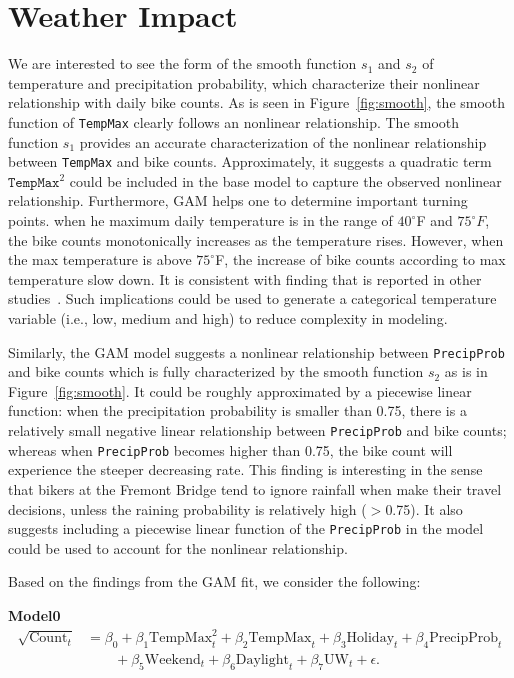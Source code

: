 \documentclass [11pt, proquest] {uwthesis}[2015/03/03]
\begin{document}
\section{Weather Impact}

We are interested to see the form of the smooth function $s_1$ and $s_2$ of temperature and precipitation probability, which characterize their nonlinear relationship with daily bike counts. As is seen in Figure~\ref{fig:smooth}, the smooth function of \texttt{TempMax} clearly follows an nonlinear relationship. The smooth function $s_1$ provides an accurate characterization of the nonlinear relationship between \texttt{TempMax} and bike counts. Approximately, it suggests a quadratic term $\texttt{TempMax}^2$ could be included in the base model to capture the observed nonlinear relationship. Furthermore, GAM helps one to determine important turning points. 
when he maximum daily temperature is in the range of $40^{\circ}$F and $75^{\circ}F$, the bike counts monotonically increases as the temperature rises. However, when the max temperature is above $75^{\circ}$F, the increase of bike counts according to max temperature slow down. It is consistent with finding that is reported in other studies~\cite{Rose07,Richardson:2000aa}. Such implications could be used to generate a categorical temperature variable (i.e., low, medium and high) to reduce complexity in modeling.

Similarly, the GAM model suggests a nonlinear relationship between \texttt{PrecipProb} and bike counts which is fully characterized by the smooth function $s_2$ as is in Figure~\ref{fig:smooth}. It could be roughly approximated by a piecewise linear function: when the precipitation probability is smaller than 0.75, there is a relatively small negative linear relationship between \texttt{PrecipProb} and bike counts; whereas when \texttt{PrecipProb} becomes higher than 0.75, the bike count will experience the steeper decreasing rate. This finding is interesting in the sense that bikers at the Fremont Bridge tend to ignore rainfall when make their travel decisions, unless the raining probability is relatively high ($>$0.75). It also suggests including a piecewise linear function of the \texttt{PrecipProb} in the model could be used to account for the nonlinear relationship.

Based on the findings from the GAM fit, we consider the following:

\textbf{Model0}
\begin{align}
\sqrt{\text{Count}_t} &= \beta_0 + \beta_1 \text{TempMax}^2_t + \beta_2 \text{TempMax}_t + \beta_3 \text{Holiday}_t + \beta_4 \text{PrecipProb}_t  \nonumber\\
&\qquad + \beta_5 \text{Weekend}_t + \beta_6 \text{Daylight}_t + \beta_7 \text{UW}_t + \epsilon.\label{eqn:model0}
\end{align}
\end{document}
